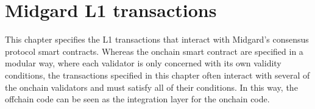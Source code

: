 \documentclass[../midgard.tex]{subfiles}
\begin{document}
\chapter{Midgard L1 transactions}
\label{h:midgard-l1-transactions}

This chapter specifies the L1 transactions that interact with Midgard's consensus protocol smart contracts.
Whereas the onchain smart contract are specified in a modular way, where each validator is only concerned with its own validity conditions, the transactions specified in this chapter often interact with several of the onchain validators and must satisfy all of their conditions.
In this way, the offchain code can be seen as the integration layer for the onchain code.
\end{document}
